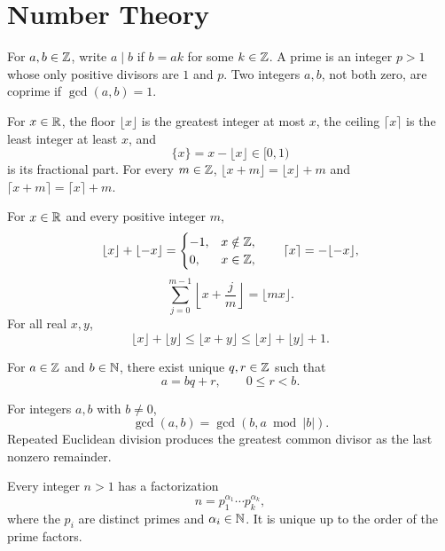 \chapter{Number Theory}

\begin{definition}
For $a, b\in\mathbb{Z}$, write $a\mid b$ if $b=ak$ for some $k\in\mathbb{Z}$. A prime is an integer $p>1$ whose only positive divisors are $1$ and $p$. Two integers $a, b$, not both zero, are coprime if $\gcd(a, b)=1$.
\end{definition}

\begin{definition}
For $x\in\mathbb{R}$, the floor $\lfloor x\rfloor$ is the greatest integer at most $x$, the ceiling $\lceil x\rceil$ is the least integer at least $x$, and
\[
 \{x\}=x-\lfloor x\rfloor\in[0,1)
\]
is its fractional part. For every $m\in\mathbb{Z}$, $\lfloor x+m\rfloor=\lfloor x\rfloor+m$ and $\lceil x+m\rceil=\lceil x\rceil+m$.
\end{definition}
\begin{proposition}
For $x\in\mathbb{R}$ and every positive integer $m$,
\[
 \lfloor x\rfloor+\lfloor-x\rfloor=
 \begin{cases}-1,&x\notin\mathbb{Z},\\0,&x\in\mathbb{Z},\end{cases}
\qquad \lceil x\rceil=-\lfloor-x\rfloor,
\]
\[
 \sum_{j=0}^{m-1}\left\lfloor x+\frac jm\right\rfloor
 =\lfloor mx\rfloor.
\]
For all real $x,y$,
\[
 \lfloor x\rfloor+\lfloor y\rfloor\le\lfloor x+y\rfloor
 \le\lfloor x\rfloor+\lfloor y\rfloor+1.
\]
\end{proposition}

\begin{theorem}
For $a\in\mathbb{Z}$ and $b\in\mathbb{N}$, there exist unique $q, r\in\mathbb{Z}$ such that
\[
 a=bq+r, \qquad 0\le r<b.
\]
\end{theorem}


\begin{proposition}
For integers $a, b$ with $b\ne0$,
\[
 \gcd(a, b)=\gcd(b, a\bmod|b|).
\]
Repeated Euclidean division produces the greatest common divisor as the last nonzero remainder.
\end{proposition}

\begin{theorem}
Every integer $n>1$ has a factorization
\[
 n=p_1^{\alpha_1}\cdots p_k^{\alpha_k},
\]
where the $p_i$ are distinct primes and $\alpha_i\in\mathbb{N}$. It is unique up to the order of the prime factors.
\end{theorem}

